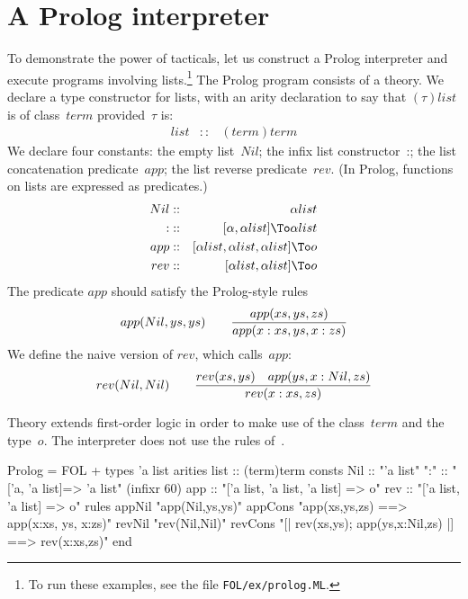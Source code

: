 \section{A Prolog interpreter}
To demonstrate the power of tacticals, let us construct a Prolog
interpreter and execute programs involving lists.\footnote{To run these
examples, see the file {\tt FOL/ex/prolog.ML}.} The Prolog program
consists of a theory.  We declare a type constructor for lists, with an
arity declaration to say that $(\tau)list$ is of class~$term$
provided~$\tau$ is:
\begin{eqnarray*}
  list  & :: & (term)term
\end{eqnarray*}
We declare four constants: the empty list~$Nil$; the infix list
constructor~{:}; the list concatenation predicate~$app$; the list reverse
predicate~$rev$.  (In Prolog, functions on lists are expressed as
predicates.)
\begin{eqnarray*}
    Nil         & :: & \alpha list \\
    {:}         & :: & [\alpha,\alpha list] \To \alpha list \\
    app & :: & [\alpha list,\alpha list,\alpha list] \To o \\
    rev & :: & [\alpha list,\alpha list] \To o 
\end{eqnarray*}
The predicate $app$ should satisfy the Prolog-style rules
\[ {app(Nil,ys,ys)} \qquad
   {app(xs,ys,zs) \over app(x:xs, ys, x:zs)} \]
We define the naive version of $rev$, which calls~$app$:
\[ {rev(Nil,Nil)} \qquad
   {rev(xs,ys)\quad  app(ys, x:Nil, zs) \over
    rev(x:xs, zs)} 
\]

Theory  extends first-order logic in order to make use
of the class~$term$ and the type~$o$.  The interpreter does not use the
rules of~.
\begin{ttbox}
Prolog = FOL +
types   'a list
arities list    :: (term)term
consts  Nil     :: "'a list"
        ":"     :: "['a, 'a list]=> 'a list"            (infixr 60)
        app     :: "['a list, 'a list, 'a list] => o"
        rev     :: "['a list, 'a list] => o"
rules   appNil  "app(Nil,ys,ys)"
        appCons "app(xs,ys,zs) ==> app(x:xs, ys, x:zs)"
        revNil  "rev(Nil,Nil)"
        revCons "[| rev(xs,ys); app(ys,x:Nil,zs) |] ==> rev(x:xs,zs)"
end
\end{ttbox}
